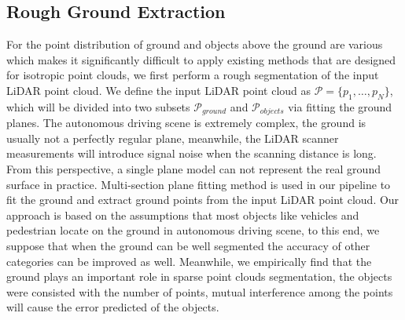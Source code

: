 \documentclass{sip}%
\begin{document}
\subsection{Rough Ground Extraction }\label{sec:ground}
For the point distribution of ground and objects above the ground are various which makes it significantly difficult to apply existing methods that are designed for isotropic point clouds, we first perform a rough segmentation of the input LiDAR point cloud. 
We define the input LiDAR point cloud as $\mathcal{P}=\{p_1,\ldots, p_N\}$, which will be divided into two subsets $\mathcal{P}_{ground}$ and $\mathcal{P}_{objects}$ via fitting the ground planes. 
The autonomous driving scene is extremely complex, the ground is usually not a perfectly regular plane, meanwhile, the LiDAR scanner measurements will introduce signal noise when the scanning distance is long. 
From this perspective, a single plane model can not represent the real ground surface in practice. 
Multi-section plane fitting method is used in our pipeline to fit the ground and extract ground points from the input LiDAR point cloud. 
Our approach is based on the assumptions that most objects like vehicles and pedestrian locate on the ground in autonomous driving scene, to this end, we suppose that when the ground can be well segmented the accuracy of other categories can be improved as well. 
Meanwhile, we empirically find that the ground plays an important role in sparse point clouds segmentation, the objects were consisted with the number of points, mutual interference among the points will cause the error predicted of the objects.
\end{document}
